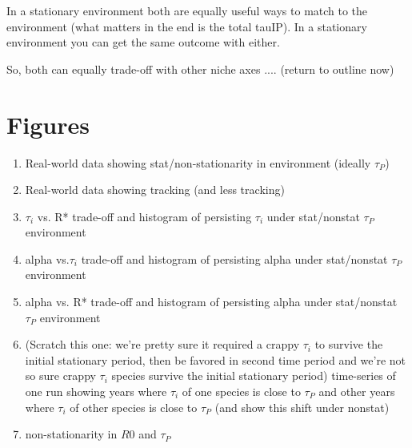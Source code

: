 \documentclass[11pt,letterpaper]{article}
\begin{document}
In a stationary environment both are equally useful ways to match to the environment (what matters in the end is the total tauIP). In a stationary environment you can get the same outcome with either. 

So, both can equally trade-off with other niche axes .... (return to outline now)




\newpage
\section{Figures}
\begin{enumerate}
\item Real-world data showing stat/non-stationarity in environment (ideally $\tau_{P}$) 
\item Real-world data showing tracking (and less tracking)
\item $\tau_{i}$ vs. R* trade-off and histogram of persisting $\tau_i$ under stat/nonstat $\tau_{P}$ environment
\item alpha vs.$\tau_i$ trade-off and histogram of persisting alpha under stat/nonstat $\tau_{P}$ environment
\item alpha vs. R* trade-off and histogram of persisting alpha under stat/nonstat $\tau_{P}$ environment
\item (Scratch this one: we're pretty sure it required a crappy $\tau_i$ to survive the initial stationary period, then be favored in second time period and we're not so sure crappy $\tau_i$ species survive the initial stationary period) time-series of one run showing years where $\tau_i$ of one species is close to $\tau_{P}$ and other years where $\tau_i$ of other species is close to $\tau_{P}$ (and show this shift under nonstat)
\item non-stationarity in $R0$ and $\tau_{P}$
\end{enumerate}




\end{document}

